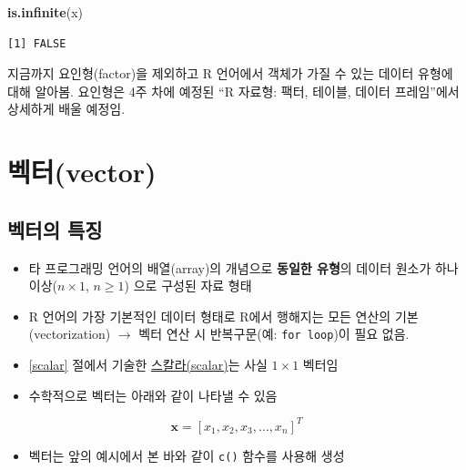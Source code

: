 \documentclass[
  11pt,
]{krantz}
\newenvironment{Shaded}{\begin{snugshade}}{\end{snugshade}}
\newcommand{\KeywordTok}[1]{\textcolor[rgb]{0.27,0.27,0.27}{\textbf{#1}}}
\newcommand{\NormalTok}[1]{#1}
\providecommand{\tightlist}{%
  \setlength{\itemsep}{0pt}\setlength{\parskip}{0pt}}
\let\BeginKnitrBlock\begin \let\EndKnitrBlock\end
\begin{document}
\begin{Shaded}
\begin{Highlighting}[]
\KeywordTok{is.infinite}\NormalTok{(x)}
\end{Highlighting}
\end{Shaded}

\begin{verbatim}
[1] FALSE
\end{verbatim}

\normalsize

\footnotesize

\BeginKnitrBlock{rmdnote}
지금까지 요인형(factor)을 제외하고 R 언어에서 객체가 가질 수 있는 데이터 유형에 대해 알아봄. 요인형은 4주 차에 예정된 ``R 자료형: 팩터, 테이블, 데이터 프레임''에서 상세하게 배울 예정임.
\EndKnitrBlock{rmdnote}

\normalsize

\hypertarget{vector}{%
\section{벡터(vector)}\label{vector}}

\hypertarget{vector-prop}{%
\subsection{벡터의 특징}\label{vector-prop}}

\begin{itemize}
\tightlist
\item
  타 프로그래밍 언어의 배열(array)의 개념으로 \textbf{동일한 유형}의 데이터 원소가 하나 이상(\(n \times 1\), \(n \geq 1\)) 으로 구성된 자료 형태
\item
  R 언어의 가장 기본적인 데이터 형태로 R에서 행해지는 모든 연산의 기본(vectorization) \(\rightarrow\) 벡터 연산 시 반복구문(예: \texttt{for\ loop})이 필요 없음.
\item
  \ref{scalar} 절에서 기술한 \protect\hyperlink{scalar}{스칼라(scalar)}는 사실 \(1 \times 1\) 벡터임
\item
  수학적으로 벡터는 아래와 같이 나타낼 수 있음
\end{itemize}

\[\mathrm{\mathbf x} = [x_1, x_2, x_3, \ldots, x_n]^T
\]

\begin{itemize}
\tightlist
\item
  벡터는 앞의 예시에서 본 바와 같이 \texttt{c()} 함수를 사용해 생성
\end{itemize}
\end{document}
